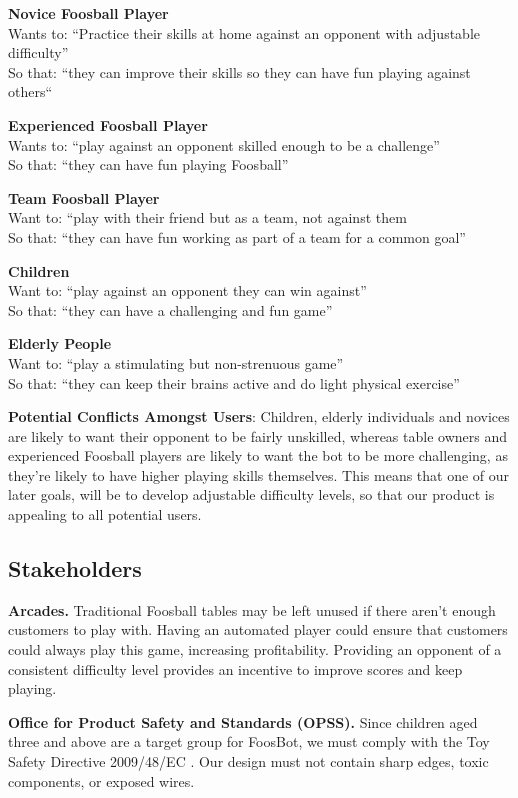 \documentclass{article}
\begin{document}
\textbf{Novice Foosball Player}\\
Wants to: “Practice their skills at home against an opponent with adjustable difficulty”\\
So that: “they can improve their skills so they can have fun playing against others“

\textbf{Experienced Foosball Player}\\
Wants to: “play against an opponent skilled enough to be a challenge”\\
So that: “they can have fun playing Foosball”

\textbf{Team Foosball Player}\\
Want to: “play with their friend but as a team, not against them\\
So that: “they can have fun working as part of a team for a common goal”

\textbf{Children}\\
Want to: “play against an opponent they can win against”\\
So that: “they can have a challenging and fun game”

\textbf{Elderly People}\\
Want to: “play a stimulating but non-strenuous game”\\
So that: “they can keep their brains active and do light physical exercise”

\textbf{Potential Conflicts Amongst Users}: Children, elderly individuals and novices are likely to want their opponent to be fairly unskilled, whereas table owners and experienced Foosball players are likely to want the bot to be more challenging, as they're likely to have higher playing skills themselves. This means that one of our later goals, will be to develop adjustable difficulty levels, so that our product is appealing to all potential users. 

\subsection{Stakeholders}
\textbf{Arcades.} Traditional Foosball tables may be left unused if there aren't enough customers to play with. Having an automated player could ensure that customers could always play this game, increasing profitability. Providing an opponent of a consistent difficulty level provides an incentive to improve scores and keep playing\cite{scoring2017game}.

\textbf{Office for Product Safety and Standards (OPSS).} Since children aged three and above are a target group for FoosBot, we must comply with the Toy Safety Directive 2009/48/EC \cite{toys2023regulations}. Our design must not contain sharp edges, toxic components\cite{toy2023safety}, or exposed wires\cite{safetytipsSG}. 
\end{document}
